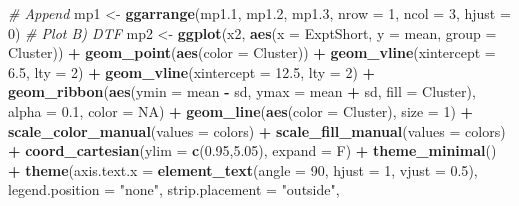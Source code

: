\documentclass[
]{article}
\newenvironment{Shaded}{\begin{snugshade}}{\end{snugshade}}
\newcommand{\CommentTok}[1]{\textcolor[rgb]{0.56,0.35,0.01}{\textit{#1}}}
\newcommand{\DataTypeTok}[1]{\textcolor[rgb]{0.13,0.29,0.53}{#1}}
\newcommand{\DecValTok}[1]{\textcolor[rgb]{0.00,0.00,0.81}{#1}}
\newcommand{\FloatTok}[1]{\textcolor[rgb]{0.00,0.00,0.81}{#1}}
\newcommand{\KeywordTok}[1]{\textcolor[rgb]{0.13,0.29,0.53}{\textbf{#1}}}
\newcommand{\NormalTok}[1]{#1}
\newcommand{\OperatorTok}[1]{\textcolor[rgb]{0.81,0.36,0.00}{\textbf{#1}}}
\newcommand{\OtherTok}[1]{\textcolor[rgb]{0.56,0.35,0.01}{#1}}
\newcommand{\StringTok}[1]{\textcolor[rgb]{0.31,0.60,0.02}{#1}}
\begin{document}
\begin{Shaded}
\begin{Highlighting}[]
{{{{{{{{{{{{{{{{{{{{{{\CommentTok{# Append }
\NormalTok{mp1 <-}\StringTok{ }\KeywordTok{ggarrange}\NormalTok{(mp1}\FloatTok{.1}\NormalTok{, mp1}\FloatTok{.2}\NormalTok{, mp1}\FloatTok{.3}\NormalTok{, }\DataTypeTok{nrow =} \DecValTok{1}\NormalTok{, }\DataTypeTok{ncol =} \DecValTok{3}\NormalTok{, }\DataTypeTok{hjust =} \DecValTok{0}\NormalTok{)}
\CommentTok{# Plot B) DTF }
\NormalTok{mp2 <-}\StringTok{ }\KeywordTok{ggplot}\NormalTok{(x2, }\KeywordTok{aes}\NormalTok{(}\DataTypeTok{x =}\NormalTok{ ExptShort, }\DataTypeTok{y =}\NormalTok{ mean, }\DataTypeTok{group =}\NormalTok{ Cluster)) }\OperatorTok{+}
\StringTok{  }\KeywordTok{geom_point}\NormalTok{(}\KeywordTok{aes}\NormalTok{(}\DataTypeTok{color =}\NormalTok{ Cluster)) }\OperatorTok{+}\StringTok{ }
\StringTok{  }\KeywordTok{geom_vline}\NormalTok{(}\DataTypeTok{xintercept =} \FloatTok{6.5}\NormalTok{,  }\DataTypeTok{lty =} \DecValTok{2}\NormalTok{) }\OperatorTok{+}\StringTok{ }
\StringTok{  }\KeywordTok{geom_vline}\NormalTok{(}\DataTypeTok{xintercept =} \FloatTok{12.5}\NormalTok{, }\DataTypeTok{lty =} \DecValTok{2}\NormalTok{) }\OperatorTok{+}
\StringTok{  }\KeywordTok{geom_ribbon}\NormalTok{(}\KeywordTok{aes}\NormalTok{(}\DataTypeTok{ymin =}\NormalTok{ mean }\OperatorTok{-}\StringTok{ }\NormalTok{sd, }\DataTypeTok{ymax =}\NormalTok{ mean }\OperatorTok{+}\StringTok{ }\NormalTok{sd, }\DataTypeTok{fill =}\NormalTok{ Cluster), }
              \DataTypeTok{alpha =} \FloatTok{0.1}\NormalTok{, }\DataTypeTok{color =} \OtherTok{NA}\NormalTok{) }\OperatorTok{+}\StringTok{ }
\StringTok{  }\KeywordTok{geom_line}\NormalTok{(}\KeywordTok{aes}\NormalTok{(}\DataTypeTok{color =}\NormalTok{ Cluster), }\DataTypeTok{size =} \DecValTok{1}\NormalTok{) }\OperatorTok{+}
\StringTok{  }\KeywordTok{scale_color_manual}\NormalTok{(}\DataTypeTok{values =}\NormalTok{ colors) }\OperatorTok{+}
\StringTok{  }\KeywordTok{scale_fill_manual}\NormalTok{(}\DataTypeTok{values =}\NormalTok{ colors) }\OperatorTok{+}
\StringTok{  }\KeywordTok{coord_cartesian}\NormalTok{(}\DataTypeTok{ylim =} \KeywordTok{c}\NormalTok{(}\FloatTok{0.95}\NormalTok{,}\FloatTok{5.05}\NormalTok{), }\DataTypeTok{expand =}\NormalTok{ F) }\OperatorTok{+}
\StringTok{  }\KeywordTok{theme_minimal}\NormalTok{() }\OperatorTok{+}
\StringTok{  }\KeywordTok{theme}\NormalTok{(}\DataTypeTok{axis.text.x =} \KeywordTok{element_text}\NormalTok{(}\DataTypeTok{angle =} \DecValTok{90}\NormalTok{, }\DataTypeTok{hjust =} \DecValTok{1}\NormalTok{, }\DataTypeTok{vjust =} \FloatTok{0.5}\NormalTok{),}
        \DataTypeTok{legend.position =} \StringTok{"none"}\NormalTok{, }\DataTypeTok{strip.placement =} \StringTok{"outside"}\NormalTok{,}
}}}}}}}}}}}}}}}}}}}}}}
\end{Highlighting}
\end{Shaded}
\end{document}
